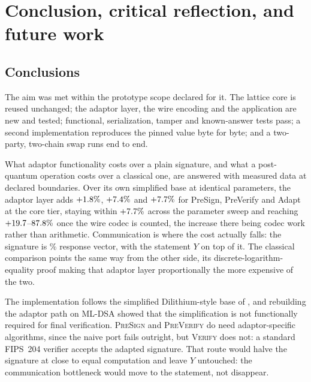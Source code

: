 \chapter[Conclusion and future work]{Conclusion, critical reflection, and future work}
\label{ch:conclusion}

\section{Conclusions}
\label{sec:conclusions}

The aim was met within the prototype scope declared for it. The lattice core is reused
unchanged; the adaptor layer, the wire encoding and the application are new and tested;
functional, serialization, tamper and known-answer tests pass; a second implementation
reproduces the pinned value byte for byte; and a two-party, two-chain swap runs end to
end.

What adaptor functionality costs over a plain signature, and what a post-quantum operation
costs over a classical one, are answered with measured data at declared boundaries. Over
its own simplified base at identical parameters, the adaptor layer adds $+1.8\%$,
$+7.4\%$ and $+7.7\%$ for PreSign, PreVerify and Adapt at the core tier,
staying within $+7.7\%$ across the parameter sweep and reaching
$+19.7$--$87.8\%$ once the wire codec is counted, the increase there
being codec work rather than arithmetic. Communication is where the cost actually falls:
the signature is \zPctTarget\% response vector, with the statement $Y$ on top of it. The
classical comparison points the same way from the other side, its
discrete-logarithm-equality proof making that adaptor layer proportionally the more
expensive of the two.

The implementation follows the simplified Dilithium-style base of \cite{esgin2020post}, and
rebuilding the adaptor path on ML-DSA showed that the simplification is not functionally
required for final verification. \textsc{PreSign} and \textsc{PreVerify} do need
adaptor-specific algorithms, since the naive port fails outright, but \textsc{Verify} does
not: a standard FIPS~204 verifier accepts the adapted signature. That route would halve the
signature at close to equal computation and leave $Y$ untouched: the communication bottleneck would move to the statement, not disappear.

